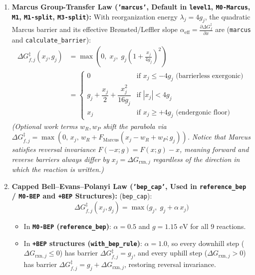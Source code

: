 \documentclass[11pt,a4paper]{article}
\begin{document}
\begin{enumerate}[leftmargin=1.8em]
    \item \textbf{Marcus Group-Transfer Law (\texttt{'marcus'}, Default in \texttt{level1}, \texttt{M0-Marcus}, \texttt{M1}, \texttt{M1-split}, \texttt{M3-split}):}
    With reorganization energy $\lambda_j = 4 g_j$, the quadratic Marcus barrier and its effective Br\o nsted/Leffler slope $\alpha_{\text{eff}} = \frac{\partial \Delta G_f^\ddagger}{\partial x}$ are (\texttt{marcus} and \texttt{calculate\_\allowbreak{}barrier}):
    \begin{equation}
    \begin{aligned}
    \Delta G_{f,j}^\ddagger(x_j, g_j) &= \max\!\left( 0,\; x_j,\; g_j \left(1 + \frac{x_j}{4 g_j}\right)^2 \right) \\
    &= \begin{cases}
    0 & \text{if } x_j \le -4 g_j \text{ (barrierless exergonic)} \\[4pt]
    g_j + \dfrac{x_j}{2} + \dfrac{x_j^2}{16 g_j} & \text{if } |x_j| < 4 g_j \\[6pt]
    x_j & \text{if } x_j \ge +4 g_j \text{ (endergonic floor)}
    \end{cases}
    \end{aligned}
    \end{equation}
    \emph{(Optional work terms $w_R, w_P$ shift the parabola via $\Delta G_{f,j}^\ddagger = \max(0,\, x_j,\, w_R + F_{\text{Marcus}}(x_j - w_R + w_P; g_j))$. Notice that Marcus satisfies reversal invariance $F(-x; g) = F(x; g) - x$, meaning forward and reverse barriers always differ by $x_j = \Delta G_{\text{rxn}, j}$ regardless of the direction in which the reaction is written.)}

    \item \textbf{Capped Bell--Evans--Polanyi Law (\texttt{'bep\_\allowbreak{}cap'}, Used in \texttt{reference\_\allowbreak{}bep} / \texttt{M0-BEP} and \texttt{+BEP} Structures):}
    (\texttt{bep\_\allowbreak{}cap}):
    \begin{equation}
    \Delta G_{f,j}^\ddagger(x_j, g_j) = \max\!\big( g_j,\; g_j + \alpha \, x_j \big)
    \end{equation}
    \begin{itemize}[leftmargin=1.5em]
        \item In \textbf{\texttt{M0-BEP} (\texttt{reference\_\allowbreak{}bep})}: $\alpha = 0.5$ and $g = 1.15\text{ eV}$ for all 9 reactions.
        \item In \textbf{\texttt{+BEP} structures (\texttt{with\_\allowbreak{}bep\_\allowbreak{}rule})}: $\alpha = 1.0$, so every downhill step ($\Delta G_{\text{rxn}, j} \le 0$) has barrier $\Delta G_{f,j}^\ddagger = g_j$, and every uphill step ($\Delta G_{\text{rxn}, j} > 0$) has barrier $\Delta G_{f,j}^\ddagger = g_j + \Delta G_{\text{rxn}, j}$, restoring reversal invariance.
    \end{itemize}
\end{enumerate}
\end{document}
